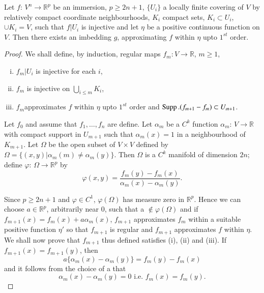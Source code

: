 \begin{theorem}\label{chap2:sec9:thm2} %
  Let $f$: $V^n \to \mathbb{R}^p$ be an immersion, $p \geq 2n+1$, $\{
  U_i \}$ a locally finite covering of $V$ by relatively compact
  coordinate neighbourhoods, $K_i$ compact sets, $K_i \subset U_i$,
  $\cup K_i=V$, such that $f|U_i$ is injective and let $\eta$ be a
  positive continuous function on $V$. Then there exists an imbedding
  $g$, approximating $f$ within $\eta$ upto $1^{st}$ order. 
\end{theorem}

\begin{proof}
  We shall define, by induction, regular maps $f_m: V \to
  \mathbb{R}$, $m \geq 1$, 
  \begin{enumerate}[(i)]
  \item $f_m |U_i$ is injective for each $i$,
  \item $f_m$ is injective on $\bigcup \limits_{i \leq m}K_i$,
  \item $f_m$\pageoriginale approximates $f$ within $\eta$ upto $1^{st}$ order and
    $\operatorname{Supp}.(f_{m+1}-f_m) \subset U_{m+1}$. 
  \end{enumerate}
  Let $f_0$ and assume that $f_1, \ldots ,f_n$ are define. Let
  $\alpha_m$ be a $C^k$ function $\alpha_m$: $V\to \mathbb{R}$ with
  compact support in $U_{m+1}$ such that $\alpha_m (x)=1$ in a
  neighbourhood of $K_{m+1}$. Let $\Omega$ be the open subset of $V
  \times V$ defined by $\Omega= \{ (x, y) | \alpha _m (m)\neq \alpha_m
  (y)\}$. Then $\Omega$ is a $C^k$ manifold of dimension $2n$; define
  $\varphi$: $\Omega \to \mathbb{R}^p$ by 
  $$
  \varphi (x, y) = \frac{f_m (y)-f_m (x)}{\alpha_m(x)-\alpha_m(y)}.
  $$
  
  Since $p \geq 2n+1$ and $\varphi \in C^1$, $\varphi (\Omega)$ has
  measure zero in $\mathbb{R}^p$. Hence we can choose $a \in
  \mathbb{R}^p$, arbitrarily near $0$, such that a $\notin \varphi
  (\Omega)$ and if $f_{m+1}(x)=f_m(x)+a \alpha_m (x)$, $f_{m+1}$
  approximates $f_m$ within  a suitable positive function $\eta'$ so
  that $f_{m+1}$ is regular and $f_{m+1}$ approximates $f$ within
  $\eta$. We shall now prove that $f_{m+1}$ thus defined satisfies
  (i), (ii) and (iii). If $f_{m+1}(x) = f_{m+1}(y)$, then 
  \begin{equation}
    a \{ \alpha_m (x) - \alpha_m (y) \} = f_ m (y)-f_m (x)
    \tag{9.1}\label{chap2:sec9:eq9.1} 
  \end{equation}
  and it follows from the choice of a that
  $$
  \alpha_ m (x)-\alpha_m(y)=0 \text{ i.e. } f_m(x)=f_m(y).
  $$
\end{proof}

